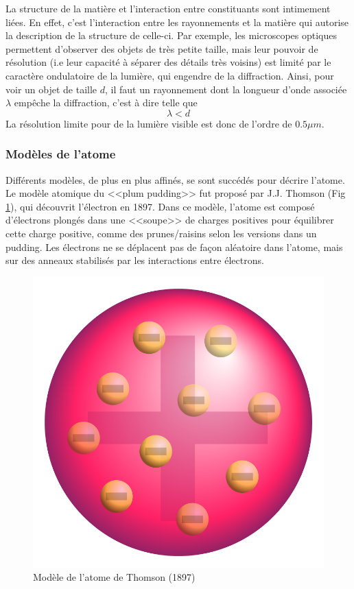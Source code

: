La structure de la matière et l'interaction entre constituants sont intimement liées. En effet, c'est l'interaction entre les rayonnements et la matière qui autorise la description de la structure de celle-ci. Par exemple, les microscopes optiques permettent d'observer des objets de très petite taille, mais leur pouvoir de résolution (i.e leur capacité à séparer des détails très voisins) est limité par le caractère ondulatoire de la lumière, qui engendre de la diffraction. Ainsi, pour voir un objet de taille $d$, il faut un rayonnement dont la longueur d'onde associée $\lambda$ empêche la diffraction, c'est à dire telle que 
\[ \lambda < d \]
La résolution limite pour de la lumière visible est donc de l'ordre de $0.5\mu m$.


\subsubsection{Modèles de l'atome}
Différents modèles, de plus en plus affinés, se sont succédés pour décrire l'atome. Le modèle atomique du <<plum pudding>> fut proposé par J.J. Thomson (Fig \ref{fig:modele_thompson}), qui découvrit l'électron en 1897. Dans ce modèle, l'atome est composé d'électrons plongés dans une <<soupe>> de charges positives pour équilibrer cette charge positive, comme des prunes/raisins selon les versions dans un pudding. Les électrons ne se déplacent pas de façon aléatoire dans l'atome, mais sur des anneaux stabilisés par les interactions entre électrons. 

\begin{figure}[ht]
    \centering
    \includegraphics[scale=0.15]{Images1/thomson.png}
    \caption{Modèle de l'atome de Thomson (1897)}
    \label{fig:modele_thompson}
\end{figure}


